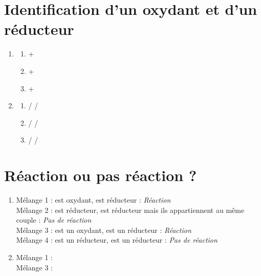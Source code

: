 \documentclass[a4paper,12pt,fleqn]{article}%
\begin{document}
\section{Identification d'un oxydant et d'un réducteur}
\begin{enumerate}
    \item \begin{enumerate}[label = \alph*]
        \item {} +  \ce{->} 
        \item {} +  
        \item {} +  
    \end{enumerate}
    \item \begin{enumerate}[label = \alph*]
        \item {}/  \hspace{2em} /
        \item {}/  \hspace{2em} /
        \item {}/ \hspace{2em} /
    \end{enumerate}
\end{enumerate}

\section{Réaction ou pas réaction ?}
\begin{enumerate}
    \item Mélange 1 :  est oxydant,  est réducteur : \emph{Réaction}\\
    Mélange 2 :  est réducteur,  est réducteur mais ils appartiennent au même couple : \emph{Pas de réaction}\\
    Mélange 3 : est un oxydant,  est un réducteur : \emph{Réaction}\\
    Mélange 4 :  est un réducteur,  est un réducteur : \emph{Pas de réaction}
    \item Mélange 1 : \\
    Mélange 3 : 
\end{enumerate}
\end{document}
